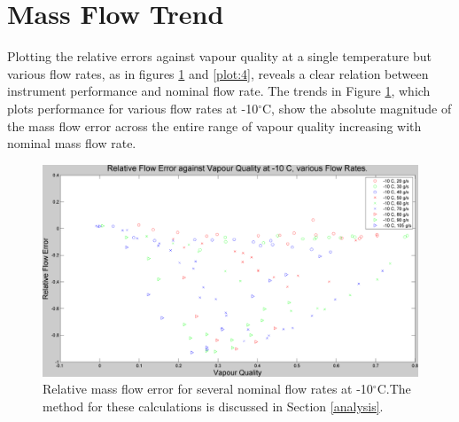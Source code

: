 \documentclass{report}
\begin{document}
\section{Mass Flow Trend}
\FloatBarrier
Plotting the relative errors against vapour quality at a single temperature but various flow rates, as in figures \ref{plot:3} and \ref{plot:4}, reveals a clear relation between instrument performance and nominal flow rate. The trends in Figure \ref{plot:3}, which plots performance for various flow rates at -10$^\circ$C, show the absolute magnitude of the mass flow error across the entire range of vapour quality increasing with nominal mass flow rate. \\ \FloatBarrier
\begin{figure}
\includegraphics[width=\textwidth]{plots/fig3}
\caption{Relative mass flow error for several nominal flow rates at -10$^\circ$C.The method for these calculations is discussed in Section \ref{analysis}.}
\label{plot:3}
\end{figure}
\end{document}
